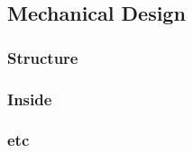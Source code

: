 \newpage
\subsection{Mechanical Design} \label{Mechanical_Design}
\label{sec:mechanical-design}

\subsubsection{Structure}
\label{sec:4.4.1}


\subsubsection{Inside}
\label{sec:4.4.2}


\subsubsection{etc}


